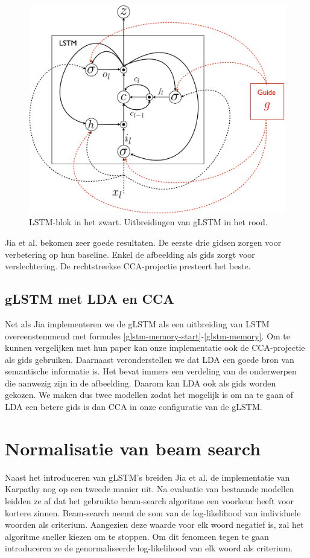 \begin{figure}[tb][h]
	\centering
	\includegraphics[width=\linewidth]{Images/glstm.pdf}
	\caption{LSTM-blok in het zwart. Uitbreidingen van gLSTM in het rood.}
	\label{fig:glstm}
\end{figure}

Jia et al. bekomen zeer goede resultaten. De eerste drie gidsen zorgen voor verbetering op hun baseline. Enkel de afbeelding als gids zorgt voor verslechtering. De rechtstreekse CCA-projectie presteert het beste.

\subsection{gLSTM met LDA en CCA}
Net als Jia implementeren we de gLSTM als een uitbreiding van LSTM overeenstemmend met formules \ref{glstm-memory-start}-\ref{glstm-memory}.
Om te kunnen vergelijken met hun paper kan onze implementatie ook de CCA-projectie als gids gebruiken.
Daarnaast veronderstellen we dat LDA een goede bron van semantische informatie is. Het bevat immers een verdeling van de onderwerpen die aanwezig zijn in de afbeelding. Daarom kan LDA ook als gids worden gekozen.
We maken dus twee modellen zodat het mogelijk is om na te gaan of LDA een betere gids is dan CCA in onze configuratie van de gLSTM.

\section{Normalisatie van beam search}
Naast het introduceren van gLSTM's breiden Jia et al. \cite{Fernando2015} de implementatie van Karpathy nog op een tweede manier uit. Na evaluatie van bestaande modellen leidden ze af dat het gebruikte beam-search algoritme een voorkeur heeft voor kortere zinnen. Beam-search neemt de som van de log-likelihood van individuele woorden als criterium. Aangezien deze waarde voor elk woord negatief is, zal het algoritme sneller kiezen om te stoppen. Om dit fenomeen tegen te gaan introduceren ze de genormaliseerde log-likelihood van elk woord als criterium.

